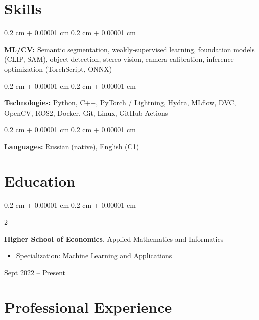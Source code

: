 \documentclass[10pt, letterpaper]{article}
\newenvironment{highlights}{
    \begin{itemize}[
        topsep=0.10 cm,
        parsep=0.10 cm,
        partopsep=0pt,
        itemsep=0pt,
        leftmargin=0.4 cm + 10pt
    ]
}{
    \end{itemize}
} %
\newenvironment{onecolentry}{
    \begin{adjustwidth}{
        0.2 cm + 0.00001 cm
    }{
        0.2 cm + 0.00001 cm
    }
}{
    \end{adjustwidth}
} %
\newenvironment{twocolentry}[2][]{
    \onecolentry
    \def\secondColumn{#2}
    \setcolumnwidth{\fill, 4.5 cm}
    \begin{paracol}{2}
}{
    \switchcolumn \raggedleft \secondColumn
    \end{paracol}
    \endonecolentry
} %
\begin{document}
    \section{Skills}

    \begin{onecolentry}
        \textbf{ML/CV:} Semantic segmentation, weakly-supervised learning, foundation models (CLIP, SAM), object detection, stereo vision, camera calibration, inference optimization (TorchScript, ONNX)
    \end{onecolentry}

    \vspace{0.2 cm}

    \begin{onecolentry}
        \textbf{Technologies:} Python, C++, PyTorch / Lightning, Hydra, MLflow, DVC, OpenCV, ROS2, Docker, Git, Linux, GitHub Actions
    \end{onecolentry}

    \vspace{0.2 cm}

    \begin{onecolentry}
        \textbf{Languages:} Russian (native), English (C1)
    \end{onecolentry}


    

    \section{Education}

        \begin{twocolentry}{
            Sept 2022 -- Present
        }
            \textbf{Higher School of Economics}, Applied Mathematics and Informatics
            \begin{highlights}
                \item Specialization: Machine Learning and Applications
            \end{highlights}
        \end{twocolentry}


    

    \section{Professional Experience}
\end{document}
